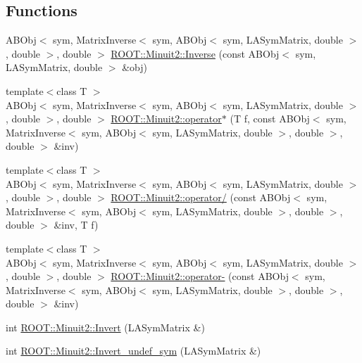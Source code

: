 \subsection*{Functions}
\begin{DoxyCompactItemize}
\item 
A\+B\+Obj$<$ sym, Matrix\+Inverse$<$ sym, A\+B\+Obj$<$ sym, L\+A\+Sym\+Matrix, double $>$, double $>$, double $>$ \mbox{\hyperlink{namespaceROOT_1_1Minuit2_ad9e57aa2fbebb59a130d5c7cc8df6bd2}{R\+O\+O\+T\+::\+Minuit2\+::\+Inverse}} (const A\+B\+Obj$<$ sym, L\+A\+Sym\+Matrix, double $>$ \&obj)
\item 
{\footnotesize template$<$class T $>$ }\\A\+B\+Obj$<$ sym, Matrix\+Inverse$<$ sym, A\+B\+Obj$<$ sym, L\+A\+Sym\+Matrix, double $>$, double $>$, double $>$ \mbox{\hyperlink{namespaceROOT_1_1Minuit2_af2850fcb007d2b85ed4285233e01f7cb}{R\+O\+O\+T\+::\+Minuit2\+::operator$\ast$}} (T f, const A\+B\+Obj$<$ sym, Matrix\+Inverse$<$ sym, A\+B\+Obj$<$ sym, L\+A\+Sym\+Matrix, double $>$, double $>$, double $>$ \&inv)
\item 
{\footnotesize template$<$class T $>$ }\\A\+B\+Obj$<$ sym, Matrix\+Inverse$<$ sym, A\+B\+Obj$<$ sym, L\+A\+Sym\+Matrix, double $>$, double $>$, double $>$ \mbox{\hyperlink{namespaceROOT_1_1Minuit2_afaff6ec8d1115025bd92259424674647}{R\+O\+O\+T\+::\+Minuit2\+::operator/}} (const A\+B\+Obj$<$ sym, Matrix\+Inverse$<$ sym, A\+B\+Obj$<$ sym, L\+A\+Sym\+Matrix, double $>$, double $>$, double $>$ \&inv, T f)
\item 
{\footnotesize template$<$class T $>$ }\\A\+B\+Obj$<$ sym, Matrix\+Inverse$<$ sym, A\+B\+Obj$<$ sym, L\+A\+Sym\+Matrix, double $>$, double $>$, double $>$ \mbox{\hyperlink{namespaceROOT_1_1Minuit2_ad2bd6cb40eae74a6e46d532060e43c10}{R\+O\+O\+T\+::\+Minuit2\+::operator-\/}} (const A\+B\+Obj$<$ sym, Matrix\+Inverse$<$ sym, A\+B\+Obj$<$ sym, L\+A\+Sym\+Matrix, double $>$, double $>$, double $>$ \&inv)
\item 
int \mbox{\hyperlink{namespaceROOT_1_1Minuit2_a3d7791001fe4298059c858771fba35db}{R\+O\+O\+T\+::\+Minuit2\+::\+Invert}} (L\+A\+Sym\+Matrix \&)
\item 
int \mbox{\hyperlink{namespaceROOT_1_1Minuit2_a053d4f8b9de7ec9beead27f2ce08be44}{R\+O\+O\+T\+::\+Minuit2\+::\+Invert\+\_\+undef\+\_\+sym}} (L\+A\+Sym\+Matrix \&)
\end{DoxyCompactItemize}
